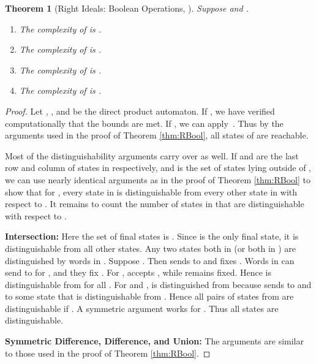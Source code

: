\documentclass[final]{dmtcs-episciences}
\newcommand{\noin}{\noindent}
\newcommand{\be}{\begin{enumerate}}
\newcommand{\ee}{\end{enumerate}}
\newtheorem{theorem}{Theorem}
\theoremstyle{definition}
\theoremstyle{remark}
\begin{document}
\begin{theorem}[Right Ideals: Boolean Operations, ]
\label{thm:RBool2}
Suppose  and .
\be
\item
The complexity of  is .
\item
The complexity of  is .
\item
The complexity of  is .
\item
The complexity of  is .
\ee
\end{theorem}
\begin{proof}
Let , , and  be the direct product automaton. 
If , we have verified computationally that the bounds are met. If ,  we can apply~\cite[Theorem 1]{BBMR14}. Thus by the arguments used in the proof of Theorem \ref{thm:RBool}, all states of  are reachable. 

Most of the distinguishability arguments carry over as well.
If  and  are the last row and column of states in  respectively, and  is the set of states lying outside of , we can use nearly identical arguments as in the proof of Theorem \ref{thm:RBool} to show that for , every state in  is distinguishable from every other state in  with respect to .
It remains to count the number of states in  that are distinguishable with respect to .

\noin\textbf{Intersection:}
Here the set of final states is . Since  is the only final state, it is distinguishable from all other states.
Any two states both in  (or both in ) are distinguished by words in .
Suppose . Then  sends  to  and fixes .
Words in  can send  to  for , and they fix .
For ,  accepts , while  remains fixed.
Hence  is distinguishable from  for all . 
For  and ,  is distinguished from  because  sends  to  and  to some state that is distinguishable from .
Hence all pairs of states from  are distinguishable if . A symmetric argument works for . Thus all  states are distinguishable.

\noin\textbf{Symmetric Difference, Difference, and Union:}
The arguments are similar to those used in the proof of Theorem \ref{thm:RBool}. 
\end{proof}
\end{document}
